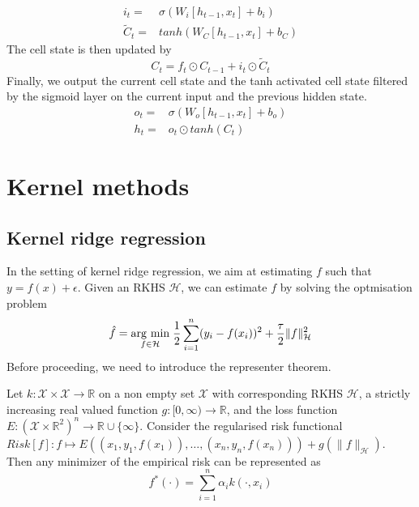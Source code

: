 \begin{equation}
    \begin{aligned}
        i_t=&\sigma(W_i [h_{t-1},x_t]+b_i)
        \\
        \tilde{C}_t=&tanh(W_C [h_{t-1},x_t]+b_C)
    \end{aligned}
\end{equation}
The cell state is then updated by
\begin{equation}
    C_t=f_t\odot C_{t-1}+i_t\odot \tilde{C}_t
\end{equation}
Finally, we output the current cell state and the tanh activated cell state filtered by the sigmoid layer on the current input and the previous hidden state.
\begin{equation}
    \begin{aligned}
    o_t=& \sigma(W_o[h_{t-1},x_t]+b_o)
    \\
    h_t=& o_t \odot tanh(C_t)
\end{aligned}
\end{equation}


\section{Kernel methods}
\subsection{Kernel ridge regression}
In the setting of kernel ridge regression, we aim at estimating $f$ such that $y=f(x)+\epsilon$. Given an RKHS $\mathcal{H}$, we can estimate $f$ by solving the optmisation problem
\begin{equation}\label{eq:kernel ridge}
    \hat{f}=\underset{f\in \mathcal{H}}{\operatorname{arg}\,\operatorname{min}}\;\frac{1}{2}\sum\limits_{i=1}^n(y_i-f(x_i))^2+\frac{\tau}{2}\|f\|_{\mathcal{H}}^2
\end{equation}
Before proceeding, we need to introduce the representer theorem.
\begin{theorem}
    Let $k:\mathcal{X} \times \mathcal{X} \to \mathbb{R}$ on a non empty set $\mathcal{X}$ with corresponding RKHS $\mathcal{H}$,
    a strictly increasing real valued function $g:[0,\infty) \to \mathbb{R}$, and the loss function $E:(\mathcal{X}\times \mathbb{R}^2)^n \to \mathbb{R} \cup \{\infty\}$.
    Consider the regularised risk functional $Risk[f]:f \mapsto  E\left((x_{1},y_{1},f(x_{1})),\ldots, (x_{n},y_{n},f(x_{n}))\right)+g\left(\| f\|_{\mathcal{H}} \right)$. Then any minimizer of the empirical risk can be represented as $$ f^{*}(\cdot )=\sum\limits_{i=1}^{n}\alpha _{i}k(\cdot ,x_{i})$$
\end{theorem}

